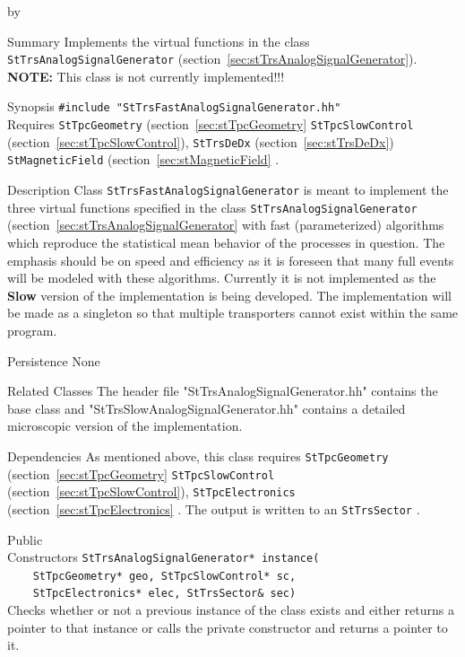 \documentclass[twoside]{article}
\newcommand{\comp}[1]{\texttt{#1}}%
\newcommand{\entrylabel}[1]{\mbox{\textbf{{#1}}}\hfil}%
\newenvironment{entry}
{\begin{list}{}%
    {\renewcommand{\makelabel}{\entrylabel}%
     \setlength{\labelwidth}{90pt}%
     \setlength{\leftmargin}{\labelwidth}
     \advance\leftmargin by \labelsep%
      }%
    }%
  {\end{list}}
\newcommand{\Entrylabel}[1]%
{\raisebox{0pt}[1ex][0pt]{\makebox[\labelwidth][l]%
    {\parbox[t]{\labelwidth}{\hspace{0pt}\textbf{{#1}}}}}}
\newenvironment{Entry}%
{\renewcommand{\entrylabel}{\Entrylabel}\begin{entry}}%
  {\end{entry}}
\begin{document}
\begin{Entry}
\item[Summary]
   Implements the virtual functions in the class 
  \comp{StTrsAnalogSignalGenerator} 
  (section~\ref{sec:stTrsAnalogSignalGenerator}).
  {\bf NOTE:} This class is not currently implemented!!!

\item[Synopsis]
 \verb+#include "StTrsFastAnalogSignalGenerator.hh"+\\
  Requires \comp{StTpcGeometry} (section~\ref{sec:stTpcGeometry} 
   \comp{StTpcSlowControl} 
  (section~\ref{sec:stTpcSlowControl}), 
  \comp{StTrsDeDx} (section~\ref{sec:stTrsDeDx}) 
   \comp{StMagneticField} (section~\ref{sec:stMagneticField} 
  .

\item[Description]
Class \comp{StTrsFastAnalogSignalGenerator} is meant to implement
the three virtual
functions specified in the class \comp{StTrsAnalogSignalGenerator} 
(section~\ref{sec:stTrsAnalogSignalGenerator} with fast (parameterized)
algorithms which reproduce the statistical mean behavior of the 
processes in question.  The emphasis should be on speed and
efficiency as it is foreseen that many full events
will be modeled with these algorithms.  Currently it is
not implemented as the {\bf Slow} version of the implementation
is being developed.  The implementation will be made as a 
singleton  so that
multiple transporters cannot exist within the same program. 

\item[Persistence]
   None

\item[Related Classes]
The header file "StTrsAnalogSignalGenerator.hh" contains the
base class and "StTrsSlowAnalogSignalGenerator.hh" contains 
a detailed microscopic version of the implementation.

\item[Dependencies]
  As mentioned above, this class requires \comp{StTpcGeometry} 
  (section~\ref{sec:stTpcGeometry} 
   \comp{StTpcSlowControl} 
  (section~\ref{sec:stTpcSlowControl}), 
  \comp{StTpcElectronics} (section~\ref{sec:stTpcElectronics} 
  .  The output is written to
  an \comp{StTrsSector} .

\item[Public \\ Constructors]
   \verb+StTrsAnalogSignalGenerator* instance(+\\
   \verb+    StTpcGeometry* geo, StTpcSlowControl* sc,+\\
   \verb+    StTpcElectronics* elec, StTrsSector& sec)+\\
   Checks whether or not a previous instance of the class exists and
   either returns a pointer to that instance or calls the private constructor
   and returns a pointer to it.


\end{Entry}
\end{document}

